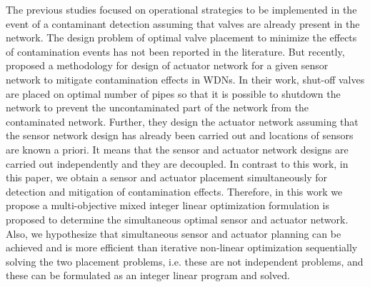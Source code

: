 \documentclass[authoryear,preprint,review,12pt]{elsarticle}
\begin{document}
The previous studies focused on operational strategies to be implemented in the event of a contaminant detection assuming that valves are already present in the network. The design problem of optimal valve placement to minimize  the effects of  contamination events has not been reported in the literature. But recently, \cite{PALLETI_Actuator} proposed a methodology for design of actuator network for a given sensor network to mitigate contamination effects in WDNs. In their work, shut-off valves are placed on optimal number of pipes so that it is possible to shutdown the network to prevent the uncontaminated part of the network from the contaminated network.  Further, they design the actuator network assuming that the sensor network design has already been carried out and locations of sensors are known a priori. It means that the sensor and actuator network designs are carried out independently and they are decoupled.  In contrast to this work, in this paper, we obtain a sensor and actuator placement simultaneously for detection and mitigation of contamination effects.  Therefore, in this work we propose a multi-objective mixed integer linear optimization formulation is proposed to determine the simultaneous optimal sensor and actuator network. Also, we hypothesize that simultaneous sensor and actuator planning can be achieved and is more efficient than iterative non-linear optimization sequentially solving the two placement problems, %
i.e. these are not independent problems, and these can be formulated as an integer linear program and solved.


%
%
%
%
%
\end{document}
